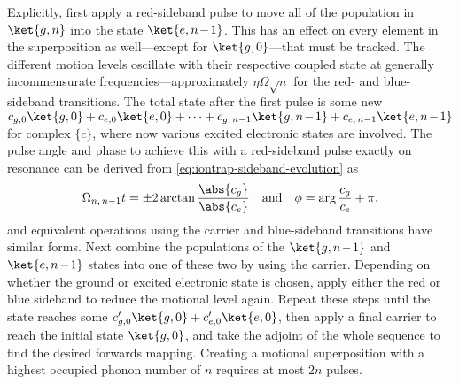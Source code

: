 Explicitly, first apply a red-sideband pulse to move all of the population in $\ket{g,n}$ into the state $\ket{e,\msquash{n-1}}$.
This has an effect on every element in the superposition as well---except for $\ket{g,0}$---that must be tracked.
The different motion levels oscillate with their respective coupled state at generally incommensurate frequencies---approximately $\eta\Omega\sqrt n$ for the red- and blue-sideband transitions.
The total state after the first pulse is some new $c_{g,0}\ket{g,0} + c_{e,0}\ket{e,0} + \dotsb + c_{g,\,n-1}\ket{g,\msquash{n-1}} + c_{e,\,n-1}\ket{e,\msquash{n-1}}$ for complex $\{c\}$, where now various excited electronic states are involved.
The pulse angle and phase to achieve this with a red-sideband pulse exactly on resonance can be derived from \cref{eq:iontrap-sideband-evolution} as
\begin{equation}\label{eq:coherence-creation-angles}
\Omega_{n,\,n-1}t = \pm2\arctan\frac{\abs{c_g}}{\abs{c_e}} \quad\text{and}\quad
\phi = \arg\frac{c_g}{c_e} + \pi,
\end{equation}
and equivalent operations using the carrier and blue-sideband transitions have similar forms.
Next combine the populations of the $\ket{g,\msquash{n-1}}$ and $\ket{e,\msquash{n-1}}$ states into one of these two by using the carrier.
Depending on whether the ground or excited electronic state is chosen, apply either the red or blue sideband to reduce the motional level again.
Repeat these steps until the state reaches some $c_{g,0}'\ket{g,0} + c_{e,0}'\ket{e,0}$, then apply a final carrier to reach the initial state $\ket{g,0}$, and take the adjoint of the whole sequence to find the desired forwards mapping.
Creating a motional superposition with a highest occupied phonon number of $n$ requires at most $2n$ pulses.

